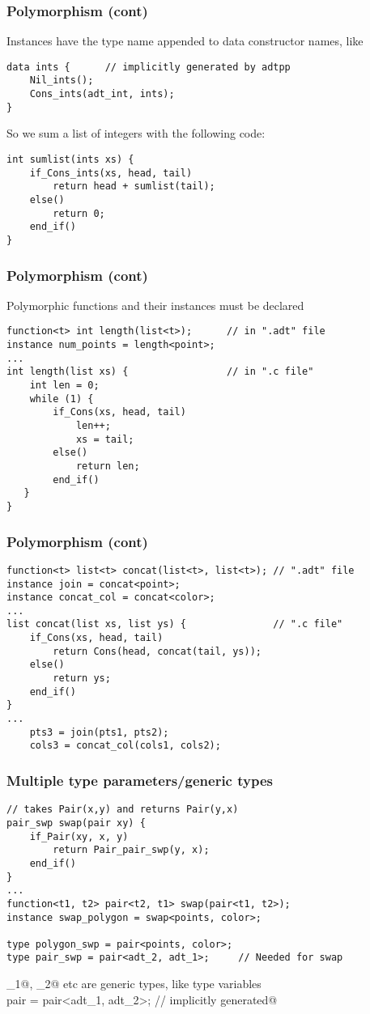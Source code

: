 \documentclass[t,t]{beamer}
\begin{document}
\begin{frame}[fragile]
\frametitle{Polymorphism (cont)}
Instances have the type name appended to data constructor
names, like
\begin{verbatim}
data ints {      // implicitly generated by adtpp
    Nil_ints();
    Cons_ints(adt_int, ints);
}
\end{verbatim}
So we sum a list of integers with the following code:
\begin{verbatim}
int sumlist(ints xs) {
    if_Cons_ints(xs, head, tail)
        return head + sumlist(tail);
    else()
        return 0;
    end_if()
}
\end{verbatim}
\end{frame}

\begin{frame}[fragile]
\frametitle{Polymorphism (cont)}
Polymorphic functions and their instances must be declared
\begin{verbatim}
function<t> int length(list<t>);      // in ".adt" file
instance num_points = length<point>;
...
int length(list xs) {                 // in ".c file"
    int len = 0;
    while (1) {
        if_Cons(xs, head, tail)
            len++;
            xs = tail;
        else()
            return len;
        end_if()
   }
}
\end{verbatim}
\end{frame}

\begin{frame}[fragile]
\frametitle{Polymorphism (cont)}
\begin{verbatim}
function<t> list<t> concat(list<t>, list<t>); // ".adt" file
instance join = concat<point>;
instance concat_col = concat<color>;
...
list concat(list xs, list ys) {               // ".c file"
    if_Cons(xs, head, tail)
        return Cons(head, concat(tail, ys));
    else()
        return ys;
    end_if()
}
...
    pts3 = join(pts1, pts2);
    cols3 = concat_col(cols1, cols2);
\end{verbatim}
\end{frame}

\begin{frame}[fragile]
\frametitle{Multiple type parameters/generic types}
\begin{verbatim}
// takes Pair(x,y) and returns Pair(y,x)
pair_swp swap(pair xy) {
    if_Pair(xy, x, y)
        return Pair_pair_swp(y, x);
    end_if()
}
...
function<t1, t2> pair<t2, t1> swap(pair<t1, t2>);
instance swap_polygon = swap<points, color>;

type polygon_swp = pair<points, color>;
type pair_swp = pair<adt_2, adt_1>;     // Needed for swap
\end{verbatim}
\verb@adt_1@, \verb@adt_2@ etc are generic types, like type
variables\\
\verb@type pair = pair<adt_1, adt_2>;     // implicitly generated@ 
\end{frame}
\end{document}
